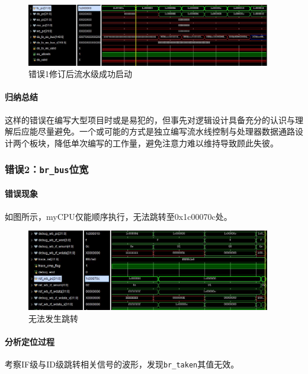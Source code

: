 \documentclass[UTF-8,twoside,c5size]{ctexart}
\begin{document}
	\begin{figure}[!h]
		\centering
		\includegraphics*[width=0.95\textwidth]{03-dbg-01-02.jpg}
		\caption{错误1修订后流水级成功启动}
	\end{figure}
	
	\paragraph{归纳总结}\hfill
	
	这样的错误在编写大型项目时或是易犯的，但事先对逻辑设计具备充分的认识与理解后应能尽量避免。一个或可能的方式是独立编写流水线控制与处理器数据通路设计两个板块，降低单次编写的工作量，避免注意力难以维持导致顾此失彼。
	
	\subsubsection{错误\textbf{2：}\texttt{br\_bus}位宽}
	\paragraph{错误现象}\hfill
	
	如图所示，myCPU仅能顺序执行，无法跳转至0x1c00070c处。
	\begin{figure}[!h]
		\centering
		\includegraphics*[width=0.95\textwidth]{03-dbg-02-01.jpg}
		\caption{无法发生跳转}
	\end{figure}

	\paragraph{分析定位过程}\hfill
	
	考察IF级与ID级跳转相关信号的波形，发现\texttt{br\_taken}其值无效。
\end{document}

